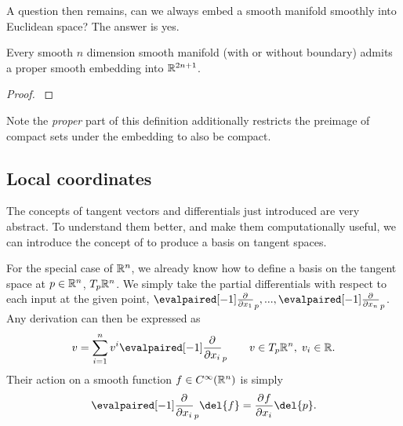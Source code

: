 A question then remains, can we always embed a smooth manifold smoothly into Euclidean space?
The answer is yes.
\begin{theorem}
	\label{thm:whiteny_embedding}
	Every smooth \(n\) dimension smooth manifold (with or without boundary) admits a proper smooth embedding into \(\mathbb{R}^{2n+1}\).
\end{theorem}
\begin{proof}
	\textcite[Theorem 1]{whitney1936differentiable}
\end{proof}
Note the \emph{proper} part of this definition additionally restricts the preimage of compact sets under the embedding to also be compact.

\subsection{Local coordinates}
\label{sec:local_coordinates}
The concepts of tangent vectors and differentials just introduced are very abstract.
To understand them better, and make them computationally useful, we can introduce the concept of  to produce a basis on tangent spaces.

For the special case of \(\mathbb{R}^n\), we already know how to define a basis on the tangent space at \(p\in \mathbb{R}^n\), \(T_p\mathbb{R}^n\).
We simply take the partial differentials with respect to each input at the given point, \(\eval{\pd{}{x_1}}_p, .
.., \eval{\pd{}{x_n}}_p\).
Any derivation can then be expressed as \[v = \sum_{i=1}^n v^i \eval{\pd{}{x_i}}_p \quad\quad v \in T_p\R^n ,\; v_i \in \R.\]
Their action on a smooth function \(f\in C^\infty(\mathbb{R}^n)\) is simply \[\eval{\pd{}{x_i}}_p \del{f} = \pd{f}{x_i}\del{p}.\] 

